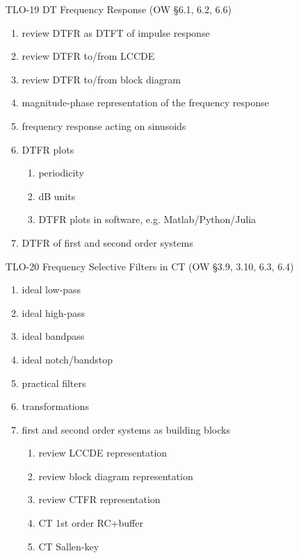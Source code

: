 \begin{enumerate}
\item[TLO-19] DT Frequency Response (OW \S 6.1, 6.2, 6.6)
  \begin{enumerate}
  \item review DTFR as DTFT of impulse response
  \item review DTFR to/from LCCDE
  \item review DTFR to/from block diagram 
  \item magnitude-phase representation of the frequency response
  \item frequency response acting on sinusoids
  \item DTFR plots  
    \begin{enumerate}
    \item periodicity
    \item dB units
    \item DTFR plots in software, e.g. Matlab/Python/Julia
    \end{enumerate}
  \item DTFR of first and second order systems
  \end{enumerate}
  
\item[TLO-20] Frequency Selective Filters in CT (OW \S 3.9, 3.10, 6.3, 6.4) 
  \begin{enumerate}
  \item ideal low-pass
  \item ideal high-pass
  \item ideal bandpass
  \item ideal notch/bandstop
  \item practical filters
  \item transformations
  \item first and second order systems as building blocks
    \begin{enumerate}
    \item review LCCDE representation
    \item review block diagram representation
    \item review CTFR representation
    \item CT 1st order RC+buffer
    \item CT Sallen-key
    \end{enumerate}
  \end{enumerate}
  

\end{enumerate}

